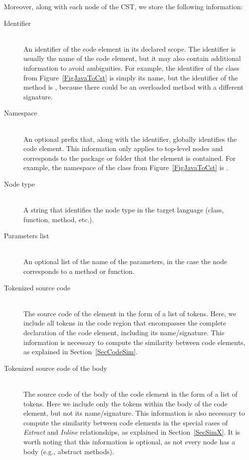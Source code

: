 Moreover, along with each node of the CST, we store the following information:
\begin{description}
    \item[Identifier] \hfill \\
    An identifier of the code element in its declared scope. 
    The identifier is usually the name of the code element, but it may also contain additional information to avoid ambiguities.
    For example, the identifier of the class  from Figure~\ref{FigJavaToCst} is simply its name, but the identifier of the method  is ,  because there could be an overloaded method with a different signature.
    
    \item[Namespace] \hfill \\
    An optional prefix that, along with the identifier, globally identifies the code element. 
    This information only applies to top-level nodes and corresponds to the package or folder that the element is contained. For example, the namespace of the class  from Figure~\ref{FigJavaToCst} is .
    
    \item[Node type] \hfill \\
    A string that identifies the node type in the target language (class, function, method, etc.).
    
    \item[Parameters list]  \hfill \\
    An optional list of the name of the parameters, in the case the node corresponds to a method or function.
    
    \item[Tokenized source code]  \hfill \\
    The source code of the element in the form of a list of tokens.
    Here, we include all tokens in the code region that encompasses the complete declaration of the code element, including its name/signature.
    This information is necessary to compute the similarity between code elements, as explained in Section~\ref{SecCodeSim}.
    
    
    \item[Tokenized source code of the body]  \hfill \\
    The source code of the body of the code element in the form of a list of tokens.
    Here we include only the tokens within the body of the code element, but not its name/signature.
    This information is also necessary to compute the similarity between code elements in the special cases of \textit{Extract} and \textit{Inline} relationships, as explained in Section~\ref{SecSimX}.
    It is worth noting that this information is optional, as not every node has a body (e.g., abstract methods).
    
\end{description}

